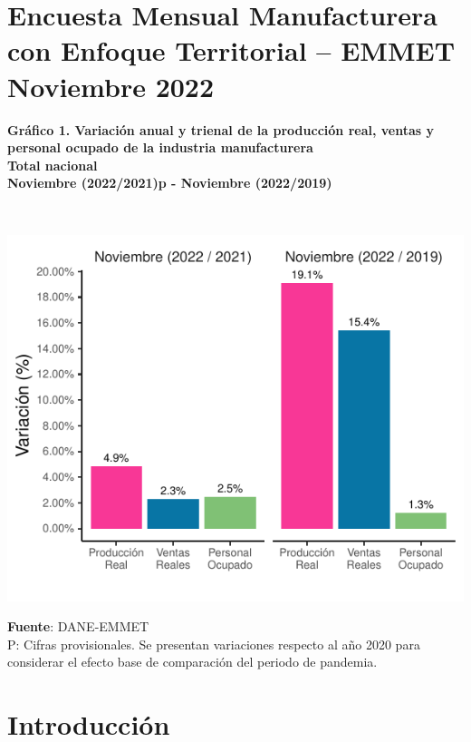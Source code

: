\documentclass[
]{article}
\author{}
\date{\vspace{-2.5em}}
\begin{document}
\hypertarget{encuesta-mensual-manufacturera-con-enfoque-territorial-emmet-noviembre-2022}{%
\section*{Encuesta Mensual Manufacturera con Enfoque Territorial --
EMMET Noviembre
2022}\label{encuesta-mensual-manufacturera-con-enfoque-territorial-emmet-noviembre-2022}}

\textbf{Gráfico 1. Variación anual y trienal de la producción real,
ventas y personal ocupado de la industria manufacturera}\\
\textbf{Total nacional}\\
\textbf{Noviembre (2022/2021)p - Noviembre (2022/2019)}\\
\strut \\

\begin{center}\includegraphics{boletin_files/figure-latex/variacion-1} \end{center}

\textbf{Fuente}: DANE-EMMET\\
P: Cifras provisionales. Se presentan variaciones respecto al año 2020
para considerar el efecto base de comparación del periodo de pandemia.

\newpage
\renewcommand\contentsname{}
\setcounter{tocdepth}{1}
\tableofcontents

\newpage

\hypertarget{introducciuxf3n}{%
\section*{Introducción}\label{introducciuxf3n}}
\end{document}
